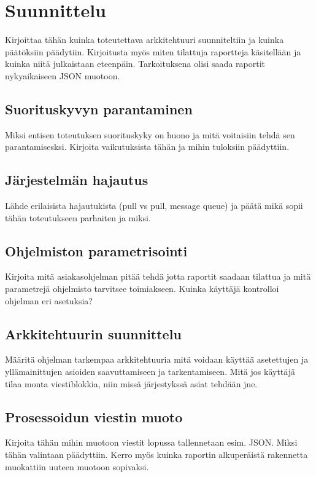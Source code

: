 \chapter{Suunnittelu}
\label{ch:suunnittelu}
Kirjoittaa tähän kuinka toteutettava arkkitehtuuri suunniteltiin ja kuinka päätöksiin päädytiin. Kirjoitusta myös miten tilattuja raportteja käsitellään ja kuinka niitä julkaistaan eteenpäin. Tarkoituksena olisi saada raportit nykyaikaiseen JSON muotoon.

\section{Suorituskyvyn parantaminen}
Miksi entisen toteutuksen suorituskyky on huono ja mitä voitaisiin tehdä sen parantamisesksi. Kirjoita vaikutuksista tähän ja mihin tuloksiin päädyttiin.

\section{Järjestelmän hajautus}
Lähde erilaisista hajautukista (pull vs pull, message queue) ja päätä mikä sopii tähän toteutukseen parhaiten ja miksi. 

\section{Ohjelmiston parametrisointi}
Kirjoita mitä asiakasohjelman pitää tehdä jotta raportit saadaan tilattua ja mitä parametrejä ohjelmisto tarvitsee toimiakseen. Kuinka käyttäjä kontrolloi ohjelman eri asetuksia?

\section{Arkkitehtuurin suunnittelu}
Määritä ohjelman tarkempaa arkkitehtuuria mitä voidaan käyttää asetettujen ja yllämainittujen asioiden saavuttamiseen ja tarkentamiseen. Mitä jos käyttäjä tilaa monta viestiblokkia, niin missä järjestykssä asiat tehdään jne.

\section{Prosessoidun viestin muoto}
Kirjoita tähän mihin muotoon viestit lopussa tallennetaan esim. JSON. Miksi tähän valintaan päädyttiin. Kerro myös kuinka raportin alkuperäistä rakennetta muokattiin uuteen muotoon sopivaksi.